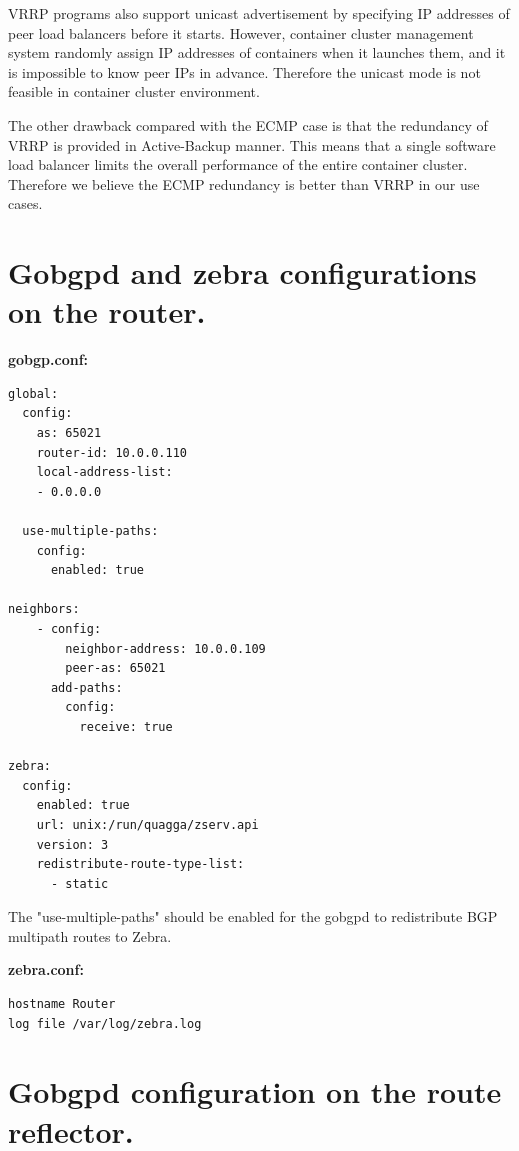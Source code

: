 VRRP programs also support unicast advertisement by specifying IP addresses of peer load balancers before it starts.
However, container cluster management system randomly assign IP addresses of containers when it launches them, and it is impossible to know peer IPs in advance. 
Therefore the unicast mode is not feasible in container cluster environment.

The other drawback compared with the ECMP case is that the redundancy of VRRP is provided in Active-Backup manner.
This means that a single software load balancer limits the overall performance of the entire container cluster.
Therefore we believe the ECMP redundancy is better than VRRP in our use cases.

\section{Gobgpd and zebra configurations on the router.}

{\bf\normalsize gobgp.conf:}
\begin{verbatim}
global:
  config:
    as: 65021
    router-id: 10.0.0.110
    local-address-list:
    - 0.0.0.0

  use-multiple-paths:
    config:
      enabled: true

neighbors:
    - config:
        neighbor-address: 10.0.0.109
        peer-as: 65021
      add-paths:
        config:
          receive: true

zebra:
  config:
    enabled: true
    url: unix:/run/quagga/zserv.api
    version: 3
    redistribute-route-type-list: 
      - static

\end{verbatim}
\label{appendix:router_config}

The "use-multiple-paths" should be enabled for the gobgpd to redistribute BGP multipath routes to Zebra.

%
{\bf\normalsize zebra.conf:}
\begin{verbatim}
hostname Router
log file /var/log/zebra.log
\end{verbatim}



\section{Gobgpd configuration on the route reflector.}
\label{appendix:route_reflector_config}


